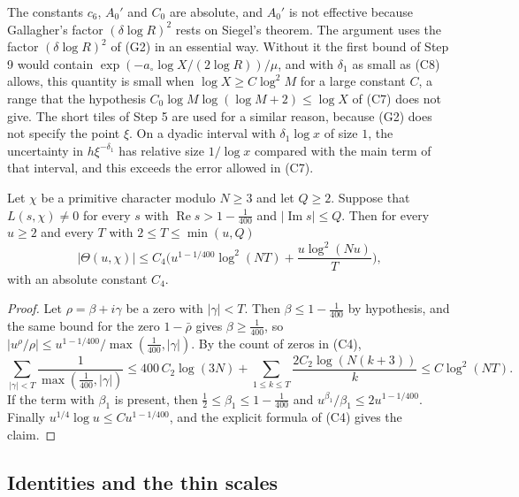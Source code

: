 The constants $c_6$, $A_0'$ and $C_0$ are absolute, and $A_0'$ is not effective because Gallagher's factor $(\delta\log R)^2$ rests on Siegel's theorem. The argument uses the factor $(\delta\log R)^2$ of (G2) in an essential way. Without it the first bound of Step 9 would contain $\exp(-a_\circ\log X/(2\log R))/\mu$, and with $\delta_1$ as small as (C8) allows, this quantity is small when $\log X\ge C\log^2M$ for a large constant $C$, a range that the hypothesis $C_0\log M\log(\log M+2)\le\log X$ of (C7) does not give. The short tiles of Step 5 are used for a similar reason, because (G2) does not specify the point $\xi$. On a dyadic interval with $\delta_1\log x$ of size $1$, the uncertainty in $h\xi^{-\delta_1}$ has relative size $1/\log x$ compared with the main term of that interval, and this exceeds the error allowed in (C7).



\begin{lemma}\label{boxpsi}
Let $\chi$ be a primitive character modulo $N\ge3$ and let $Q\ge2$. Suppose that $L(s,\chi)\ne0$ for every $s$ with $\operatorname{Re}s>1-\frac1{400}$ and $\lvert\operatorname{Im}s\rvert\le Q$. Then for every $u\ge2$ and every $T$ with $2\le T\le\min(u,Q)$
\[
\lvert\Theta(u,\chi)\rvert\le C_4\Big(u^{1-1/400}\log^2(NT)+\frac{u\log^2(Nu)}T\Big),
\]
with an absolute constant $C_4$.
\end{lemma}

\begin{proof}
Let $\rho=\beta+i\gamma$ be a zero with $\lvert\gamma\rvert<T$. Then $\beta\le1-\frac1{400}$ by hypothesis, and the same bound for the zero $1-\bar\rho$ gives $\beta\ge\frac1{400}$, so $\lvert u^\rho/\rho\rvert\le u^{1-1/400}/\max(\frac1{400},\lvert\gamma\rvert)$. By the count of zeros in (C4),
\[
\sum_{\lvert\gamma\rvert<T}\frac1{\max(\frac1{400},\lvert\gamma\rvert)}\le400\,C_2\log(3N)+\sum_{1\le k\le T}\frac{2C_2\log(N(k+3))}{k}\le C\log^2(NT).
\]
If the term with $\beta_1$ is present, then $\frac12\le\beta_1\le1-\frac1{400}$ and $u^{\beta_1}/\beta_1\le2u^{1-1/400}$. Finally $u^{1/4}\log u\le Cu^{1-1/400}$, and the explicit formula of (C4) gives the claim.
\end{proof}

\subsection{Identities and the thin scales}

